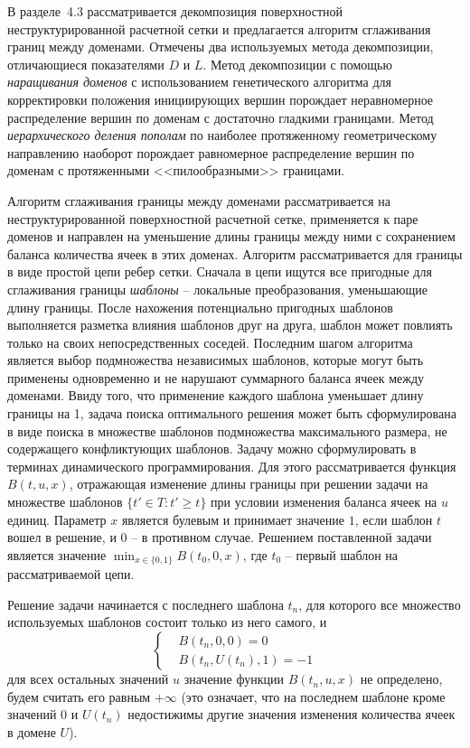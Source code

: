 \documentclass[a4paper,14pt]{extarticle}                     %
\theoremstyle{plain}                                         %
\begin{document}

В разделе~4.3 рассматривается декомпозиция поверхностной неструктурированной расчетной сетки и предлагается алгоритм сглаживания границ между доменами.
Отмечены два используемых метода декомпозиции, отличающиеся показателями $D$ и $L$.
Метод декомпозиции с помощью \textit{наращивания доменов} с использованием генетического алгоритма для корректировки положения инициирующих вершин порождает неравномерное распределение вершин по доменам с достаточно гладкими границами.
Метод \textit{иерархического деления пополам} по наиболее протяженному геометрическому направлению наоборот порождает равномерное распределение вершин по доменам с протяженными <<пилообразными>> границами.

Алгоритм сглаживания границы между доменами рассматривается на неструктурированной поверхностной расчетной сетке, применяется к паре доменов и направлен на уменьшение длины границы между ними с сохранением баланса количества ячеек в этих доменах.
Алгоритм рассматривается для границы в виде простой цепи ребер сетки.
Сначала в цепи ищутся все пригодные для сглаживания границы \textit{шаблоны} -- локальные преобразования, уменьшающие длину границы.
После нахожения потенциально пригодных шаблонов выполняется разметка влияния шаблонов друг на друга, шаблон может повлиять только на своих непосредственных соседей.
Последним шагом алгоритма является выбор подмножества независимых шаблонов, которые могут быть применены одновременно и не нарушают суммарного баланса ячеек между доменами.
Ввиду того, что применение каждого шаблона уменьшает длину границы на 1, задача поиска оптимального решения может быть сформулирована в виде поиска в множестве шаблонов подмножества максимального размера, не содержащего конфликтующих шаблонов.
Задачу можно сформулировать в терминах динамического программирования.
Для этого рассматривается функция $B(t, u, x)$, отражающая изменение длины границы при решении задачи на множестве шаблонов $\{ t' \in T : t' \ge t \}$ при условии изменения баланса ячеек на $u$ единиц.
Параметр $x$ является булевым и принимает значение $1$, если шаблон $t$ вошел в решение, и $0$ -- в противном случае.
Решением поставленной задачи является значение $\min_{x \in \{0, 1\}}{B(t_0, 0, x)}$, где $t_0$ -- первый шаблон на рассматриваемой цепи.

Решение задачи начинается с последнего шаблона $t_n$, для которого все множество используемых шаблонов состоит только из него самого, и
\begin{equation*}
	\left\{
		\begin{aligned}
			& B(t_n, 0, 0) = 0 \\
			& B(t_n, U(t_n), 1) = -1
		\end{aligned}
	\right.
\end{equation*}
для всех остальных значений $u$ значение функции $B(t_n, u, x)$ не определено, будем считать его равным $+\infty$ (это означает, что на последнем шаблоне кроме значений $0$ и $U(t_n)$ недостижимы другие значения изменения количества ячеек в домене $U$).
\end{document}
